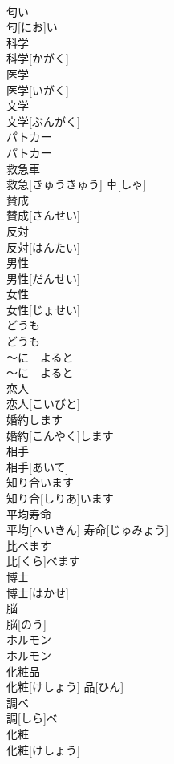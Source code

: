 \documentclass[8pt]{extreport}
\begin{document}
\begin{CJK}{UTF8}{min}
\\	匂い	
\\	匂[にお]い	
\\	科学	
\\	科学[かがく]	
\\	医学	
\\	医学[いがく]	
\\	文学	
\\	文学[ぶんがく]	
\\	パトカー	
\\	パトカー	
\\	救急車	
\\	救急[きゅうきゅう] 車[しゃ]	
\\	賛成	
\\	賛成[さんせい]	
\\	反対	
\\	反対[はんたい]	
\\	男性	
\\	男性[だんせい]	
\\	女性	
\\	女性[じょせい]	
\\	どうも	
\\	どうも	
\\	〜に　よると	
\\	〜に　よると	
\\	恋人	
\\	恋人[こいびと]	
\\	婚約します	
\\	婚約[こんやく]します	
\\	相手	
\\	相手[あいて]	
\\	知り合います	
\\	知り合[しりあ]います	
\\	平均寿命	
\\	平均[へいきん] 寿命[じゅみょう]	
\\	比べます	
\\	比[くら]べます	
\\	博士	
\\	博士[はかせ]	
\\	脳	
\\	脳[のう]	
\\	ホルモン	
\\	ホルモン	
\\	化粧品	
\\	化粧[けしょう] 品[ひん]	
\\	調べ	
\\	調[しら]べ	
\\	化粧	
\\	化粧[けしょう]	

\end{CJK}
\end{document}

